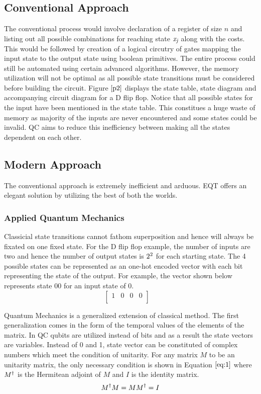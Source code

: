 \documentclass[conference]{IEEEtran}
\begin{document}
\subsection{Conventional Approach}
The conventional process would involve declaration of a register of size $\textit{n}$ and listing out all possible combinations for reaching state $\textit{x\textsubscript{j}}$ along with the costs. This would be followed by creation of a logical circutry of gates mapping the input state to the output state using boolean primitives. The entire process could still be automated using certain advanced algorithms. However, the memory utilization will not be optimal as all possible state transitions must be considered before building the circuit. Figure $\ref{p2}$ displays the state table, state diagram and accompanying circuit diagram for a D flip flop. Notice that all possible states for the input have been mentioned in the state table. This constitues a huge waste of memory as majority of the inputs are never encountered and some states could be invalid. QC aims to reduce this inefficiency between making all the states dependent on each other.

\subsection{Modern Approach}

The conventional approach is extremely inefficient and arduous. EQT offers an elegant solution by utilizing the best of both the worlds. 

\subsubsection{Applied Quantum Mechanics}
Classicial state transitions cannot fathom superposition and hence will always be fixated on one fixed state. For the D flip flop example, the number of inputs are two and hence the number of output states is $2\textsuperscript{2}$ for each starting state. The 4 possible states can be represented as an one-hot encoded vector with each bit representing the state of the output. For example, the vector shown below represents state 00 for an input state of 0.
$$
\begin{bmatrix} 
1&0&0&0\\
\end{bmatrix}
\quad
$$

Quantum Mechanics is a generalized extension of classical method. The first generalization comes in the form of the temporal values of the elements of the matrix. In QC qubits are utilized instead of bits and as a result the state vectors are variables. Instead of 0 and 1, state vector can be constituted of complex numbers which meet the condition of unitarity. For any matrix $\textit{M}$ to be an unitarity matrix, the only necessary condition is shown in Equation $\ref{eq:1}$ where $M\textsuperscript{$\dagger$}$ is the Hermitean adjoint of $\textit{M}$ and $\textit{I}$ is the identity matrix. 
{\scriptsize
\begin{equation}
\label{eq:1}
M\textsuperscript{$\dagger$}M = MM\textsuperscript{$\dagger$} = I
\end{equation}
}
\end{document}
